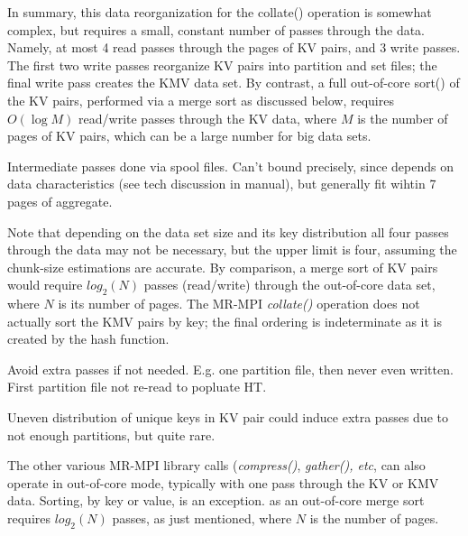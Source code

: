 In summary, this data reorganization for the {collate()} operation is
somewhat complex, but requires a small, constant number of passes
through the data.  Namely, at most 4 read passes through the pages of
KV pairs, and 3 write passes.  The first two write passes reorganize
KV pairs into partition and set files; the final write pass creates
the KMV data set.  By contrast, a full out-of-core sort() of the KV
pairs, performed via a merge sort as discussed below, requires
$O(\log{M})$ read/write passes through the KV data, where $M$ is the
number of pages of KV pairs, which can be a large number for big data
sets.

Intermediate passes done via spool files.  Can't bound precisely,
since depends on data characteristics (see tech discussion in manual),
but generally fit wihtin 7 pages of aggregate.

Note that depending on the data set size and its key distribution all
four passes through the data may not be necessary, but the upper limit
is four, assuming the chunk-size estimations are accurate.  By
comparison, a merge sort of KV pairs would require $log_2(N)$
passes (read/write) through the out-of-core data set, where $N$ is its
number of pages.  The MR-MPI {\it collate()} operation does not
actually sort the KMV pairs by key; the final ordering is
indeterminate as it is created by the hash function.

Avoid extra passes if not needed.  E.g. one partition file, then never
even written.  First partition file not re-read to popluate HT.

Uneven distribution of unique keys in KV pair could induce extra
passes due to not enough partitions, but quite rare.



The other various MR-MPI library calls ({\it compress()}, {\it
gather(), etc}, can also operate in out-of-core mode, typically with
one pass through the KV or KMV data.  Sorting, by
key or value, is an exception.  as an out-of-core merge sort requires
$log_2(N)$ passes, as just mentioned, where $N$ is the number of
pages.

